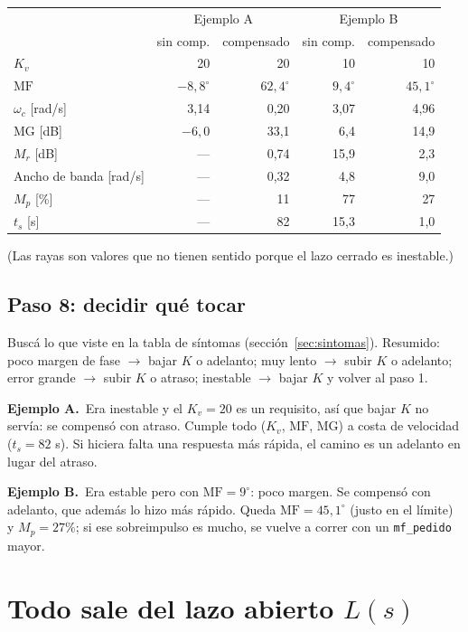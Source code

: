 \documentclass[11pt,a4paper]{article}
\newcommand{\wc}{\omega_c}
\newcommand{\MF}{\mathrm{MF}}
\newcommand{\MG}{\mathrm{MG}}
\newcommand{\Mr}{M_r}
\newcommand{\ejA}{\par\smallskip\noindent\textbf{\color{azul}Ejemplo A.}\ }
\newcommand{\ejB}{\par\smallskip\noindent\textbf{\color{rojo}Ejemplo B.}\ }
\begin{document}
\begin{center}
\small
\begin{tabular}{@{}lrrrr@{}}
\toprule
& \multicolumn{2}{c}{\textcolor{azul}{Ejemplo A}} & \multicolumn{2}{c}{\textcolor{rojo}{Ejemplo B}}\\
& sin comp. & compensado & sin comp. & compensado \\
\midrule
$K_v$ & 20 & 20 & 10 & 10\\
$\MF$ & $-8{,}8^\circ$ & $62{,}4^\circ$ & $9{,}4^\circ$ & $45{,}1^\circ$\\
$\wc$ [rad/s] & 3,14 & 0,20 & 3,07 & 4,96\\
$\MG$ [dB] & $-6{,}0$ & 33,1 & 6,4 & 14,9\\
$\Mr$ [dB] & --- & 0,74 & 15,9 & 2,3\\
Ancho de banda [rad/s] & --- & 0,32 & 4,8 & 9,0\\
$M_p$ [\%] & --- & 11 & 77 & 27\\
$t_s$ [s] & --- & 82 & 15,3 & 1,0\\
\bottomrule
\end{tabular}
\end{center}
(Las rayas son valores que no tienen sentido porque el lazo cerrado es inestable.)

\subsection{Paso 8: decidir qué tocar}
\begin{leer}
Buscá lo que viste en la tabla de síntomas (sección~\ref{sec:sintomas}). Resumido: poco margen de fase $\to$ bajar $K$ o adelanto;
muy lento $\to$ subir $K$ o adelanto; error grande $\to$ subir $K$ o atraso; inestable $\to$ bajar $K$ y volver al paso 1.
\end{leer}
\ejA Era inestable y el $K_v=20$ es un requisito, así que bajar $K$ no servía: se compensó con atraso. Cumple todo ($K_v$, $\MF$, $\MG$)
a costa de velocidad ($t_s=82$ s). Si hiciera falta una respuesta más rápida, el camino es un adelanto en lugar del atraso.

\ejB Era estable pero con $\MF=9^\circ$: poco margen. Se compensó con adelanto, que además lo hizo más rápido. Queda $\MF=45{,}1^\circ$
(justo en el límite) y $M_p=27\%$; si ese sobreimpulso es mucho, se vuelve a correr con un \texttt{mf\_pedido} mayor.

\section{Todo sale del lazo abierto \texorpdfstring{$L(s)$}{L(s)}}
\end{document}
